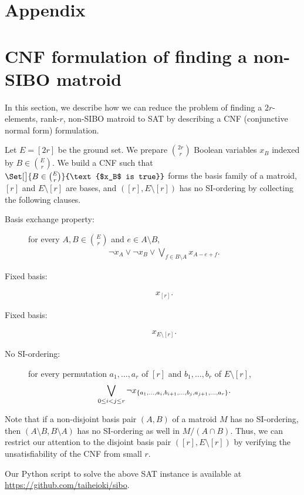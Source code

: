 \documentclass{article}
\DeclarePairedDelimiter{\set}{\{}{\}}
\theoremstyle{definition}
\begin{document}



\newpage
\appendix
\section*{Appendix}

\section{CNF formulation of finding a non-SIBO matroid}\label{sec:sat}

In this section, we describe how we can reduce the problem of finding a $2r$-elements, rank-$r$, non-SIBO matroid to SAT by describing a CNF (conjunctive normal form) formulation.

Let $E = [2r]$ be the ground set.
We prepare $\binom{2r}{r}$ Boolean variables $x_B$ indexed by $B \in \binom{E}{r}$.
We build a CNF such that $\Set[\big]{B \in \binom{E}{r}}{\text{$x_B$ is true}}$ forms the basis family of a matroid, $[r]$ and $E \setminus [r]$ are bases, and $([r], E \setminus [r])$ has no SI-ordering by collecting the following clauses.
\begin{description}
    \item[Basis exchange property:] for every $A, B \in \binom{E}{r}$ and $e \in A \setminus B$,
\begin{align}
        \neg x_A \vee \neg x_B \vee 
        \bigvee_{f \in B \setminus A} x_{A - e + f}.
    \end{align}

    \item[Fixed basis:]
\begin{align}
        x_{[r]}.
    \end{align}

    \item[Fixed basis:]
\begin{align}
        x_{E \setminus [r]}.
    \end{align}
    
    \item[No SI-ordering:] for every permutation $a_1, \dotsc, a_r$ of $[r]$ and $b_1, \dotsc, b_r$ of $E \setminus [r]$,
\begin{align}
        \bigvee_{0 \le i < j \le r} 
          \neg x_{\set{a_1, \dotsc, a_i, b_{i+1}, \dotsc, b_j, a_{j+1}, \dotsc, a_r}}.
    \end{align}
\end{description}
Note that if a non-disjoint basis pair $(A, B)$ of a matroid $M$ has no SI-ordering, then $(A \setminus B, B \setminus A)$ has no SI-ordering as well in $M/(A\cap B)$.
Thus, we can restrict our attention to the disjoint basis pair $([r], E \setminus [r])$ by verifying the unsatisfiability of the CNF from small $r$.

Our Python script to solve the above SAT instance is available at \url{https://github.com/taiheioki/sibo}.
\end{document}
